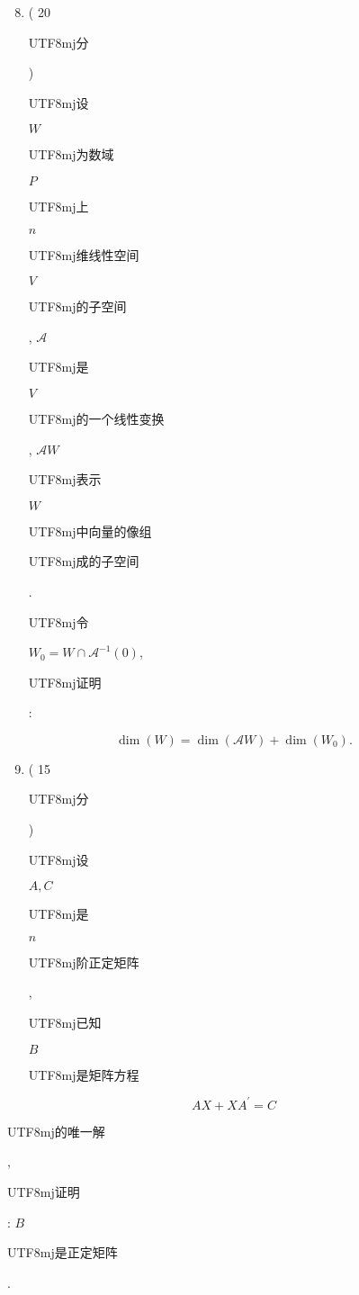 \documentclass[10pt]{article}
\begin{document}
\begin{enumerate}
  \setcounter{enumi}{7}
  \item ( 20 \begin{CJK}{UTF8}{mj}分\end{CJK}) \begin{CJK}{UTF8}{mj}设\end{CJK} $W$ \begin{CJK}{UTF8}{mj}为数域\end{CJK} $P$ \begin{CJK}{UTF8}{mj}上\end{CJK} $n$ \begin{CJK}{UTF8}{mj}维线性空间\end{CJK} $V$ \begin{CJK}{UTF8}{mj}的子空间\end{CJK}, $\mathscr{A}$ \begin{CJK}{UTF8}{mj}是\end{CJK} $V$ \begin{CJK}{UTF8}{mj}的一个线性变换\end{CJK}, $\mathscr{A} W$ \begin{CJK}{UTF8}{mj}表示\end{CJK} $W$ \begin{CJK}{UTF8}{mj}中向量的像组\end{CJK} \begin{CJK}{UTF8}{mj}成的子空间\end{CJK}. \begin{CJK}{UTF8}{mj}令\end{CJK} $W_{0}=W \cap \mathscr{A}^{-1}(0)$, \begin{CJK}{UTF8}{mj}证明\end{CJK}:
\end{enumerate}
$$
\operatorname{dim}(W)=\operatorname{dim}(\mathscr{A} W)+\operatorname{dim}\left(W_{0}\right) .
$$

\begin{enumerate}
  \setcounter{enumi}{8}
  \item ( 15 \begin{CJK}{UTF8}{mj}分\end{CJK}) \begin{CJK}{UTF8}{mj}设\end{CJK} $A, C$ \begin{CJK}{UTF8}{mj}是\end{CJK} $n$ \begin{CJK}{UTF8}{mj}阶正定矩阵\end{CJK}, \begin{CJK}{UTF8}{mj}已知\end{CJK} $B$ \begin{CJK}{UTF8}{mj}是矩阵方程\end{CJK}
\end{enumerate}
$$
A X+X A^{\prime}=C
$$
\begin{CJK}{UTF8}{mj}的唯一解\end{CJK}, \begin{CJK}{UTF8}{mj}证明\end{CJK}: $B$ \begin{CJK}{UTF8}{mj}是正定矩阵\end{CJK}.
\end{document}

